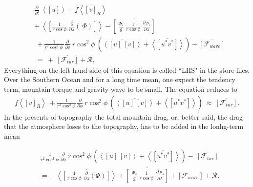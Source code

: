 \documentclass[11pt]{article}
\numberwithin{equation}{section}
\newcommand{\la}{\langle}
\newcommand{\ra}{\rangle}
\newcommand{\lara}[1]{\left\la{#1}\right\ra}
\newcommand{\cphi}{\cos \phi}
\begin{document}
\begin{align}
&\overline{  \frac{\partial} {\partial t} ~\lara{[u]}  }  - \overline{ f \lara{ [v]_R} }  \nonumber \\
&+~\overline{ \lara{ \left[ \frac{1}{r \cphi} ~ \frac{\partial}{\partial \lambda} \left(  ~\Phi  \right)   \right]} } - \overline{  \left[~\frac{\Phi_s}{g}~ \frac{1}{r \cphi} ~\frac{\partial~p_s}{\partial \lambda}\right]}  \nonumber\\ 
  &~+ \frac{1}{r^2 \cos^2{\phi} ~ }  \frac{\partial}{\partial \phi}  ~  r \cos^2{\phi} ~ \left( \overline{ \lara{ [u]~[v] } } + \overline{ \lara{[u^* v^{*}]   }  } \right) - \overline{ [ \mathcal{F}_{wave}] }   \nonumber \\
  &~= ~+  ~ \overline{ [ \mathcal{F}_{tur}] }+  \mathcal{R},
\end{align}
Everything on the left hand side of this equation is called ``LHS" in the store files. Over the Southern Ocean and for a long time mean, one expect the tendency term, mountain torque and gravity wave to be small. The equation reduces to
\begin{align}
\overline{ f \lara{ [v]_R} } ~+ \frac{1}{r^2 \cos^2{\phi} ~ }  \frac{\partial}{\partial \phi}  ~  r \cos^2{\phi} ~ \left( \overline{ \lara{ [u]~[v] } } + \overline{ \lara{[u^* v^{*}]   }  } \right)  
~\approx ~ \overline{ [ \mathcal{F}_{tur}] }.
\end{align}
%
In the presents of topography the total mountain drag, or, better said, the drag that the atmosphere loses to the topography, has to be added in the lonhg-term mean

\begin{align}
&\frac{1}{r^2 \cos^2{\phi} ~ }  \frac{\partial}{\partial \phi}  ~  r \cos^2{\phi} ~ \left( \overline{ \lara{ [u]~[v] } } + \overline{ \lara{[u^* v^{*}]   }  } \right) -  ~ \overline{ [ \mathcal{F}_{tur}] }  \nonumber \\
& = -~\overline{ \lara{ \left[ \frac{1}{r \cphi} ~ \frac{\partial}{\partial \lambda} \left( \Phi  \right)   \right]} } + \overline{  \left[~\frac{\Phi_s}{g}~ \frac{1}{r \cphi} ~\frac{\partial~p_s}{\partial \lambda}\right]}  + \overline{ [ \mathcal{F}_{wave}] } +\mathcal{R}.
\end{align}


\footnotesize

\end{document}
